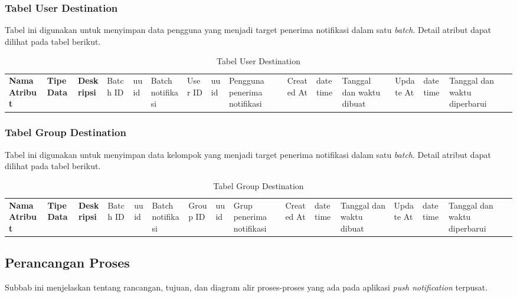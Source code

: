 \subsubsection{Tabel User Destination}
\par Tabel ini digunakan untuk menyimpan data pengguna yang menjadi target penerima notifikasi dalam satu \textit{batch}. Detail atribut dapat dilihat pada tabel berikut.
\begin{longtable}{|p{2.5cm}|p{2cm}|p{4.5cm}|}
    \hline
    \textbf{Nama Atribut} & \textbf{Tipe Data} & \textbf{Deskripsi} & \hline
    Batch ID & uuid & Batch notifikasi & \hline
    User ID & uuid & Pengguna penerima notifikasi & \hline
    Created At & datetime & Tanggal dan waktu dibuat & \hline
    Update At & datetime & Tanggal dan waktu diperbarui & \hline
    \caption{Tabel User Destination}
\end{longtable}

\subsubsection{Tabel Group Destination}
\par Tabel ini digunakan untuk menyimpan data kelompok yang menjadi target penerima notifikasi dalam satu \textit{batch}. Detail atribut dapat dilihat pada tabel berikut.
\begin{longtable}{|p{2.5cm}|p{2cm}|p{4.5cm}|}
    \hline
    \textbf{Nama Atribut} & \textbf{Tipe Data} & \textbf{Deskripsi} & \hline
    Batch ID & uuid & Batch notifikasi & \hline
    Group ID & uuid & Grup penerima notifikasi & \hline
    Created At & datetime & Tanggal dan waktu dibuat & \hline
    Update At & datetime & Tanggal dan waktu diperbarui & \hline
    \caption{Tabel Group Destination}
\end{longtable}

\subsection{Perancangan Proses}
\par Subbab ini menjelaskan tentang rancangan, tujuan, dan diagram alir proses-proses yang ada pada aplikasi
\textit{push notification} terpusat.

